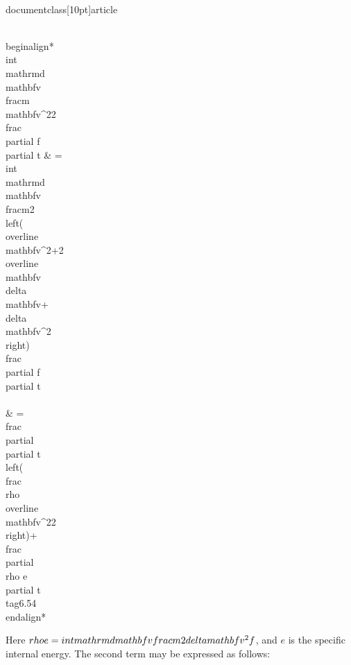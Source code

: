 \\documentclass[10pt]{article}
\begin{document}
{{{{\\begin{align*}
\\int \\mathrm{d} \\mathbf{v} \\frac{m \\mathbf{v}^{2}}{2} \\frac{\\partial f}{\\partial t} & =\\int \\mathrm{d} \\mathbf{v} \\frac{m}{2}\\left(\\overline{\\mathbf{v}}^{2}+2 \\overline{\\mathbf{v}} \\delta \\mathbf{v}+\\delta \\mathbf{v}^{2}\\right) \\frac{\\partial f}{\\partial t} \\\\
& =\\frac{\\partial}{\\partial t}\\left(\\frac{\\rho \\overline{\\mathbf{v}}^{2}}{2}\\right)+\\frac{\\partial \\rho e}{\\partial t} \\tag{6.54}
\\end{align*}


Here $\\rho e=\\int \\mathrm{d} \\mathbf{v} \\frac{m}{2} \\delta \\mathbf{v}^{2} f$, and $e$ is the specific internal energy. The second term may be expressed as follows:


}}}}
\end{document}
